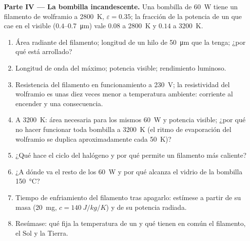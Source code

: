 \begin{problem}
\textbf{Parte IV --- La bombilla incandescente.}
Una bombilla de \qty{60}{W} tiene un filamento de wolframio a \qty{2800}{K},
$\varepsilon = 0.35$; la fracción de la potencia de un  que cae en
el visible ($0.4$--\qty{0.7}{\micro m}) vale $0.08$ a \qty{2800}{K} y $0.14$
a \qty{3200}{K}.
\begin{enumerate}[resume]
  \item Área radiante del filamento; longitud de un hilo de \qty{50}{\micro m}
        que la tenga; ¿por qué está arrollado?
  \item Longitud de onda del máximo; potencia visible; rendimiento luminoso.
  \item Resistencia del filamento en funcionamiento a \qty{230}{V}; la
        resistividad del wolframio es unas diez veces menor a temperatura
        ambiente: corriente al encender y una consecuencia.
  \item A \qty{3200}{K}: área necesaria para los mismos \qty{60}{W} y
        potencia visible; ¿por qué no hacer funcionar toda bombilla a \qty{3200}{K}
        (el ritmo de evaporación del wolframio se duplica aproximadamente cada
        \qty{50}{K})?
  \item ¿Qué hace el ciclo del halógeno y por qué permite un filamento más
        caliente?
  \item ¿A dónde va el resto de los \qty{60}{W} y por qué alcanza el
        vidrio de la bombilla \qty{150}{\celsius}?
  \item Tiempo de enfriamiento del filamento tras apagarlo: estímese a partir de
        su masa (\qty{20}{mg}, $c = \qty{140}{J/kg/K}$) y de su potencia
        radiada.
  \item Resúmase: qué fija la temperatura de un  y qué
        tienen en común el filamento, el Sol y la Tierra.
\end{enumerate}
\end{problem}
